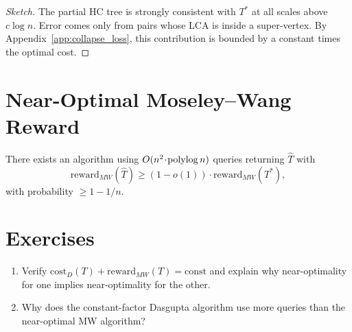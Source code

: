 \begin{proof}[Sketch]
The partial HC tree is strongly consistent with $T^*$ at all scales above $c\log n$. Error comes only from pairs whose LCA is inside a super-vertex. By Appendix~\ref{app:collapse_loss}, this contribution is bounded by a constant times the optimal cost.
\end{proof}

\section{Near-Optimal Moseley--Wang Reward}

\begin{theorem}
\label{thm:mw_approx}
There exists an algorithm using $O(n^2\!\cdot\!\operatorname{polylog} n)$ queries returning $\widehat{T}$ with
\[
\mathrm{reward}_{MW}(\widehat{T}) \geq (1-o(1))\cdot\mathrm{reward}_{MW}(T^*),
\]
with probability $\geq 1-1/n$.
\end{theorem}

\section{Exercises}

\begin{enumerate}
  \item Verify $\mathrm{cost}_D(T)+\mathrm{reward}_{MW}(T)=\mathrm{const}$ and explain why near-optimality for one implies near-optimality for the other.
  \item Why does the constant-factor Dasgupta algorithm use more queries than the near-optimal MW algorithm?
\end{enumerate}
